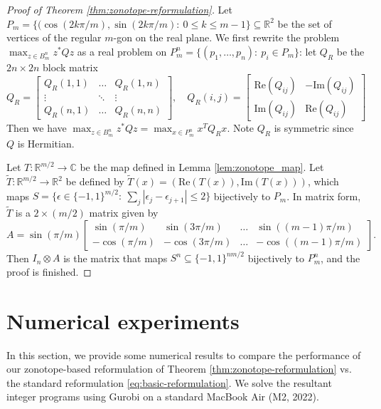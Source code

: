 \documentclass{article}
\newcommand{\RR}{\mathbb{R}}
\newcommand{\CC}{\mathbb{C}}
\theoremstyle{definition}
\begin{document}
\begin{proof}[Proof of Theorem \ref{thm:zonotope-reformulation}]
    Let $P_m=\{(\cos(2k\pi /m),\sin(2k\pi/m):~0\le k\le m-1\}\subseteq \RR^2$ be the set of vertices of the regular $m$-gon on the real plane. We first rewrite the problem $\max_{z \in B_m^n} z^* Q z$ as a real problem on $P_m^n=\{(p_1,\ldots,p_n):~p_i\in P_m\}$: let $Q_R$ be the $2n\times 2n$ block matrix
    \[
    Q_R=\begin{bmatrix}
        Q_R(1,1) & \ldots & Q_R(1,n)\\
        \vdots & \ddots & \vdots\\
        Q_R(n,1) & \ldots & Q_R(n,n)
    \end{bmatrix},\quad  Q_R(i,j)=\begin{bmatrix}
        \text{Re}(Q_{ij}) & -\text{Im}(Q_{ij})\\
        \text{Im}(Q_{ij}) & \text{Re}(Q_{ij})
    \end{bmatrix}
    \]
    Then we have $\max_{z \in B_m^n} z^* Q z=\max_{x\in P_m^n}x^T Q_R x$. Note $Q_R$ is symmetric since $Q$ is Hermitian. 

    Let $T:\RR^{m/2}\to\CC$ be the map defined in Lemma \ref{lem:zonotope_map}. Let $\tilde{T}:\RR^{m/2}\to\RR^2$ be defined by $\tilde{T}(x)=(\text{Re}(T(x)),\text{Im}(T(x)))$, which maps $S=\{\epsilon\in\{-1,1\}^{m/2}:~\sum_{j} |\epsilon_j - \epsilon_{j+1}| \leq 2\}$ bijectively to $P_m$. In matrix form, $\tilde{T}$ is a $2\times (m/2)$ matrix given by
    \[
    A=\sin(\pi/m)\begin{bmatrix}
        \sin(\pi/m) & \sin(3\pi/m) & \ldots & \sin((m-1)\pi/m)\\
        -\cos(\pi/m) & -\cos(3\pi/m) & \ldots & -\cos((m-1)\pi/m)
    \end{bmatrix}.
    \]
    Then $I_n\otimes A$ is the matrix that maps $S^n\subseteq \{-1,1\}^{nm/2}$ bijectively to $P_m^n$, and the proof is finished. 
\end{proof}

\section{Numerical experiments}\label{sec:numerics}

In this section, we provide some numerical results to compare the performance of our zonotope-based reformulation of Theorem \ref{thm:zonotope-reformulation} vs. the standard reformulation \eqref{eq:basic-reformulation}. We solve the resultant integer programs using Gurobi \cite{gurobi} on a standard MacBook Air (M2, 2022).
\end{document}
